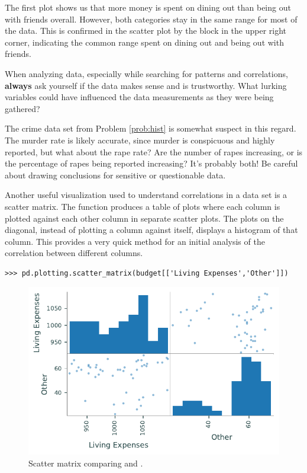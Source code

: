 The first plot shows us that more money is spent on dining out than being out with friends overall.
However, both categories stay in the same range for most of the data.
This is confirmed in the scatter plot by the block in the upper right corner, indicating the common range spent on dining out and being out with friends.

\begin{warn}
When analyzing data, especially while searching for patterns and correlations, \textbf{always} ask yourself if the data makes sense and is trustworthy.
What lurking variables could have influenced the data measurements as they were being gathered?

The crime data set from Problem \ref{prob:hist} is somewhat suspect in this regard.
The murder rate is likely accurate, since murder is conspicuous and highly reported, but what about the rape rate?
Are the number of rapes increasing, or is the percentage of rapes being reported increasing?
It's probably both!
Be careful about drawing conclusions for sensitive or questionable data.
\end{warn}

Another useful visualization used to understand correlations in a data set is a scatter matrix.
The function  produces a table of plots where each column is plotted against each other column in separate scatter plots.
The plots on the diagonal, instead of plotting a column against itself, displays a histogram of that column.
This provides a very quick method for an initial analysis of the correlation between different columns.

\begin{lstlisting}
>>> pd.plotting.scatter_matrix(budget[['Living Expenses','Other']])
\end{lstlisting}

\begin{figure}[H]
    \includegraphics[width=.7\textwidth]{figures/scatter_table.pdf}
    \caption{Scatter matrix comparing  and .}
\end{figure}



